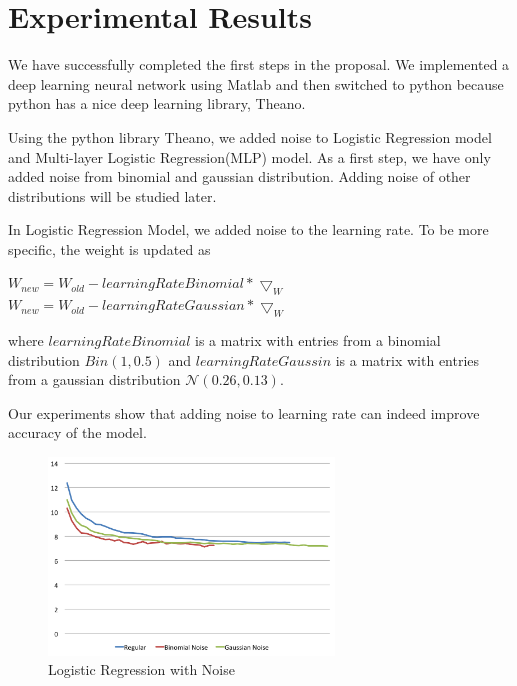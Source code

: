 \section{Experimental Results}
\label{sec:result}

We have successfully completed the first steps in the proposal.
We implemented a deep learning neural network using Matlab and then
switched to python because python has a nice deep learning library,
Theano.

Using the python library Theano, we added noise to Logistic Regression
model and Multi-layer Logistic Regression(MLP) model.
As a first step, we have only added noise from binomial and gaussian
distribution. Adding noise of other distributions will be studied later.

In Logistic Regression Model, we added noise to the learning rate.
To be more specific, the weight is updated as

\begin{center}
$W_{new} = W_{old} - learningRateBinomial * \bigtriangledown_{W}$
$W_{new} = W_{old} - learningRateGaussian * \bigtriangledown_{W}$
\end{center}

where $learningRateBinomial$ is a matrix with entries from a binomial
distribution $Bin(1,0.5)$ and $learningRateGaussin$ is a matrix with entries
from a gaussian distribution $\mathcal{N}(0.26,0.13)$.

Our experiments show that adding noise to learning rate can indeed
improve accuracy of the model.

\begin{figure}[t]
\centering
\includegraphics[width=215pt]{figs/logistic_sgd_all.png}
\caption{Logistic Regression with Noise}
\label{fig:logistic-sgd}
\end{figure}

